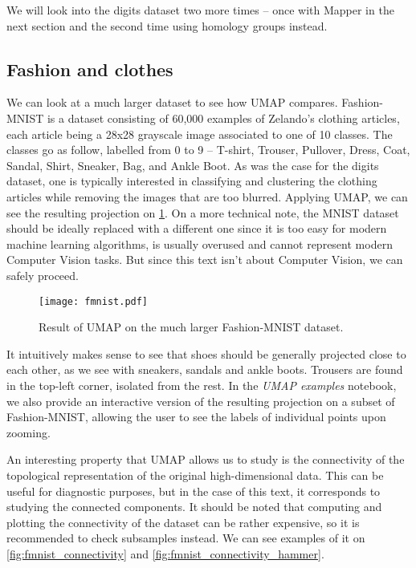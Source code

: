 We will look into the digits dataset two more times -- once with Mapper in the next section and the second time using homology groups instead.

\subsection{Fashion and clothes}
We can look at a much larger dataset to see how UMAP compares. Fashion-MNIST \cite{DBLP:journals/corr/abs-1708-07747} is a dataset consisting of 60,000 examples of Zelando's clothing articles, each article being a 28x28 grayscale image associated to one of 10 classes. The classes go as follow, labelled from 0 to 9 -- T-shirt, Trouser, Pullover, Dress, Coat, Sandal, Shirt, Sneaker, Bag, and Ankle Boot.
As was the case for the digits dataset, one is typically interested in classifying and clustering the clothing articles while removing the images that are too blurred. Applying UMAP, we can see the resulting projection on \ref{fig:fmnist}. On a more technical note, the MNIST dataset should be ideally replaced with a different one since it is too easy for modern machine learning algorithms, is usually overused and cannot represent modern Computer Vision tasks. But since this text isn't about Computer Vision, we can safely proceed.

\begin{figure}[h!]
  \centering
  \texttt{[image: fmnist.pdf]}
  \caption{Result of UMAP on the much larger Fashion-MNIST dataset.}
  \label{fig:fmnist}
\end{figure}

It intuitively makes sense to see that shoes should be generally projected close to each other, as we see with sneakers, sandals and ankle boots. Trousers are found in the top-left corner, isolated from the rest. In the \textit{UMAP examples} notebook, we also provide an interactive version of the resulting projection on a subset of Fashion-MNIST, allowing the user to see the labels of individual points upon zooming.

An interesting property that UMAP allows us to study is the connectivity of the topological representation of the original high-dimensional data. This can be useful for diagnostic purposes, but in the case of this text, it corresponds to studying the connected components. It should be noted that computing and plotting the connectivity of the dataset can be rather expensive, so it is recommended to check subsamples instead. We can see examples of it on \ref{fig:fmnist_connectivity} and \ref{fig:fmnist_connectivity_hammer}.

